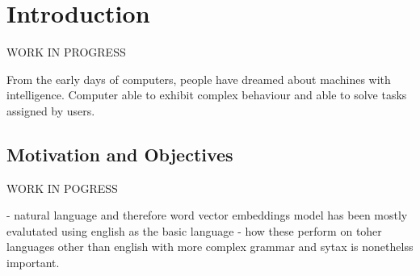 \chapter{Introduction}
\label{chapter:Introduction}
WORK IN PROGRESS

From the early days of computers, people have dreamed about machines with intelligence. Computer able to exhibit complex behaviour and able to solve tasks assigned by users.



\section{Motivation and Objectives}

\label{sec:motivation}
WORK IN POGRESS


- natural language and therefore word vector embeddings model has been mostly evalutated using english as the basic language
- how these perform on toher languages other than english with more complex grammar and sytax is nonethelss important.

